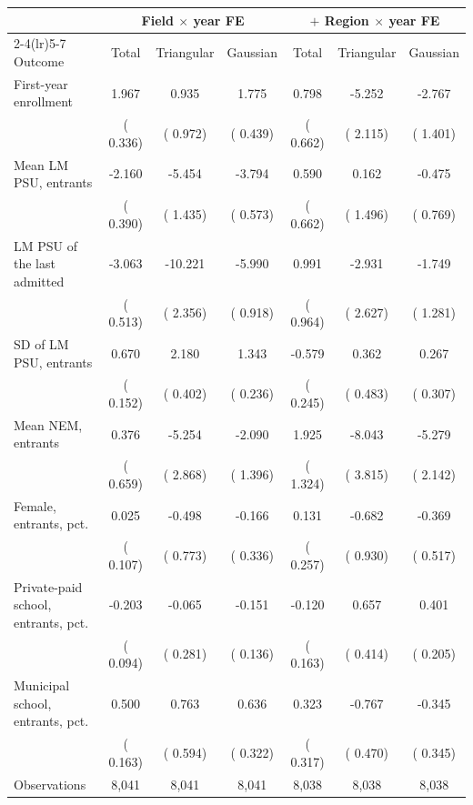\begin{tabular}{lcccccc}
\toprule
 & \multicolumn{3}{c}{Field \(\times\) year FE} & \multicolumn{3}{c}{\(+\) Region \(\times\) year FE} \\
\cmidrule(lr){2-4}\cmidrule(lr){5-7}
Outcome & Total & Triangular & Gaussian & Total & Triangular & Gaussian \\
\midrule
First-year enrollment &   1.967\sym{***} &   0.935 &   1.775\sym{***} &   0.798 &  -5.252\sym{**} &  -2.767\sym{*} \\
 & ( 0.336) & ( 0.972) & ( 0.439) & ( 0.662) & ( 2.115) & ( 1.401) \\
\addlinespace
Mean LM PSU, entrants &  -2.160\sym{***} &  -5.454\sym{***} &  -3.794\sym{***} &   0.590 &   0.162 &  -0.475 \\
 & ( 0.390) & ( 1.435) & ( 0.573) & ( 0.662) & ( 1.496) & ( 0.769) \\
LM PSU of the last admitted &  -3.063\sym{***} & -10.221\sym{***} &  -5.990\sym{***} &   0.991 &  -2.931 &  -1.749 \\
 & ( 0.513) & ( 2.356) & ( 0.918) & ( 0.964) & ( 2.627) & ( 1.281) \\
SD of LM PSU, entrants &   0.670\sym{***} &   2.180\sym{***} &   1.343\sym{***} &  -0.579\sym{**} &   0.362 &   0.267 \\
 & ( 0.152) & ( 0.402) & ( 0.236) & ( 0.245) & ( 0.483) & ( 0.307) \\
Mean NEM, entrants &   0.376 &  -5.254\sym{*} &  -2.090 &   1.925 &  -8.043\sym{**} &  -5.279\sym{**} \\
 & ( 0.659) & ( 2.868) & ( 1.396) & ( 1.324) & ( 3.815) & ( 2.142) \\
Female, entrants, pct. &   0.025 &  -0.498 &  -0.166 &   0.131 &  -0.682 &  -0.369 \\
 & ( 0.107) & ( 0.773) & ( 0.336) & ( 0.257) & ( 0.930) & ( 0.517) \\
Private-paid school, entrants, pct. &  -0.203\sym{**} &  -0.065 &  -0.151 &  -0.120 &   0.657 &   0.401\sym{*} \\
 & ( 0.094) & ( 0.281) & ( 0.136) & ( 0.163) & ( 0.414) & ( 0.205) \\
Municipal school, entrants, pct. &   0.500\sym{***} &   0.763 &   0.636\sym{**} &   0.323 &  -0.767 &  -0.345 \\
 & ( 0.163) & ( 0.594) & ( 0.322) & ( 0.317) & ( 0.470) & ( 0.345) \\
\midrule
Observations &  8,041 &  8,041 &  8,041 &  8,038 &  8,038 &  8,038 \\
\bottomrule
\end{tabular}
